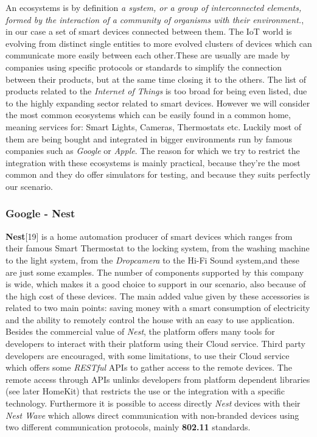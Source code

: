 An ecosystems is by definition \textit{a system, or a group of interconnected elements,
formed by the interaction of a community of organisms with their environment.},
in our case a set of smart devices connected between them. The IoT world is evolving
from distinct single entities to more evolved clusters of devices which can communicate
more easily between each other.These are usually are made by companies using specific protocols or standards
to simplify the connection between their products, but at the same time closing it to the others.
The list of products related to the \textit{Internet of Things} is too broad for
being even listed, due to the highly expanding sector related to smart devices.
However we will consider the most common ecosystems which can be easily found in a common
home, meaning services for: Smart Lights, Cameras, Thermostats etc. Luckily
most of them are being bought and integrated in bigger environments run by
famous companies such as \textit{Google} or \textit{Apple}.
The reason for which we try to restrict the integration with these ecosystems is
mainly practical, because they're the most common and they do offer simulators
for testing, and because they suits perfectly our scenario.

\subsubsection{Google - Nest}

\textbf{Nest}[19] is a home automation producer of smart devices
which ranges from their famous Smart Thermostat to the locking system, from the
washing machine to the light system, from the \textit{Dropcamera} to the Hi-Fi Sound system,and
these are just some examples. The number of components supported by this company
is wide, which makes it a good choice to support in our scenario, also because of
the high cost of these devices. The main added value given by these accessories is related
to two main points: saving money with a smart consumption of electricity and the ability
to remotely control the house with an easy to use application.
Besides the commercial value of \textit{Nest}, the platform offers many tools for developers
to interact with their platform using their Cloud service. Third party developers
are encouraged, with some limitations, to use their Cloud service which
offers some \textit{RESTful} APIs to gather access to the remote devices.
The remote access through APIs unlinks developers from platform dependent libraries (see later HomeKit)
that restricts the use or the integration with a specific technology.
Furthermore it is possible to access directly \textit{Nest} devices with their \textit{Nest Wave}
which allows direct communication with non-branded devices using two different communication protocols,
mainly \textbf{802.11} standards.


